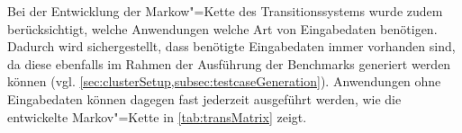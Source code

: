 Bei der Entwicklung der Markow"=Kette des Transitionssystems wurde zudem berücksichtigt, welche Anwendungen welche Art von Eingabedaten benötigen.
Dadurch wird sichergestellt, dass benötigte Eingabedaten immer vorhanden sind, da diese ebenfalls im Rahmen der Ausführung der Benchmarks generiert werden können (vgl. \cref{sec:clusterSetup,subsec:testcaseGeneration}).
Anwendungen ohne Eingabedaten können dagegen fast jederzeit ausgeführt werden, wie die entwickelte Markov"=Kette in \cref{tab:transMatrix} zeigt.
